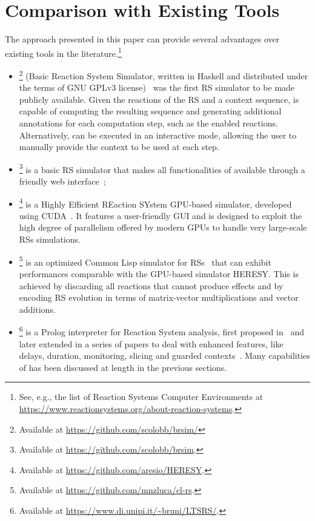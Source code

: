 
\section{Comparison with Existing Tools}\label{sec:related}

The approach presented in this paper can provide several advantages over existing tools in the literature.\footnote{See, e.g., the list of Reaction Systems Computer Environments at \url{https://www.reactionsystems.org/about-reaction-systems}.}
\begin{itemize}
\item
\brsim\footnote{Available at \url{https://github.com/scolobb/brsim/}} (Basic Reaction System Simulator, written in Haskell and distributed under the terms of GNU GPLv3 license)~\cite{DBLP:journals/tcs/AzimiGIP15} was the first RS simulator to be made publicly available. 
Given the reactions of the RS and a context sequence, \brsim is capable of computing the resulting sequence and generating additional annotations for each computation step, such as the enabled reactions.
Alternatively, \brsim can be executed in an interactive mode, allowing the user to manually provide the context to be used at each step.
\item
\WebRSim\footnote{Available at \url{https://github.com/scolobb/brsim}.} is a basic RS simulator that makes all functionalities of  \brsim available through a friendly web interface~\cite{DBLP:conf/birthday/0001RAP18};
\item 
\HERESY\footnote{Available at \url{https://github.com/aresio/HERESY}.} is a Highly Efficient REaction SYstem GPU-based simulator, developed using CUDA~\cite{DBLP:journals/fuin/NobilePSMCMB17}. It features a user-friendly GUI and is designed to exploit the high degree of parallelism offered by modern GPUs to handle very large-scale RSs simulations.
\item
\clrs\footnote{Available at \url{https://github.com/mnzluca/cl-rs}.} is an optimized Common Lisp simulator for RSs~\cite{DBLP:journals/fuin/FerrettiLMP20} that can exhibit performances comparable with the GPU-based simulator \textsf{HERESY}. This is achieved by discarding all reactions that cannot produce effects and by encoding RS evolution in terms of matrix-vector multiplications and vector additions.
\item 
\BioResolve\footnote{Available at \url{https://www.di.unipi.it/~bruni/LTSRS/}.} is a Prolog interpreter for Reaction System analysis, first proposed in~\cite{DBLP:journals/tcs/BrodoBF21} and later extended in a series of papers to deal with enhanced features, like delays, duration, monitoring, slicing and guarded contexts~\cite{DBLP:journals/nca/BrodoBFGLM23,DBLP:journals/nc/BrodoBF24,DBLP:conf/cmsb/BowlesBBFGM24}. Many capabilities of \BioResolve has been discussed at length in the previous sections.

\end{itemize}
